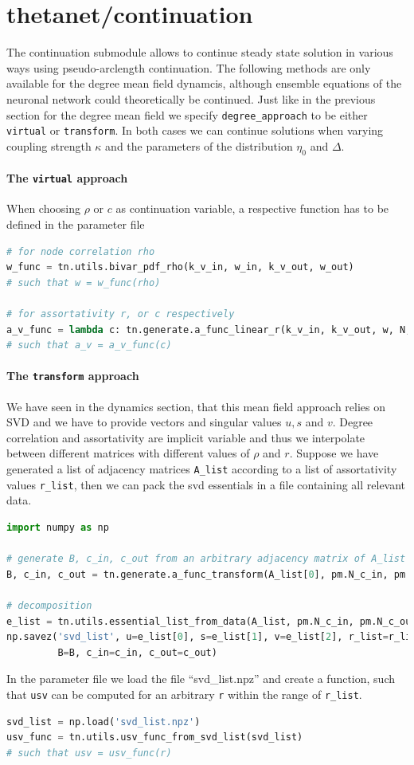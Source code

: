 \documentclass[bibliography=totoc, twoside]{article}
\numberwithin{equation}{section}
\begin{document}
\section{thetanet/continuation}
The continuation submodule allows to continue steady state solution in various ways using pseudo-arclength continuation.
The following methods are only available for the degree mean field dynamcis, although ensemble equations of the neuronal network could theoretically be continued.
Just like in the previous section for the degree mean field we specify \texttt{degree\_approach} to be either \texttt{virtual} or \texttt{transform}.
In both cases we can continue solutions when varying coupling strength $\kappa$ and the parameters of the distribution $\eta_0$ and $\Delta$.
\paragraph*{The \texttt{virtual} approach} When choosing $\rho$ or $c$ as continuation variable, a respective function has to be defined in the parameter file
\begin{lstlisting}[language=python]
# for node correlation rho
w_func = tn.utils.bivar_pdf_rho(k_v_in, w_in, k_v_out, w_out)
# such that w = w_func(rho)

# for assortativity r, or c respectively
a_v_func = lambda c: tn.generate.a_func_linear_r(k_v_in, k_v_out, w, N, c, i_prop, j_prop)
# such that a_v = a_v_func(c)
\end{lstlisting}

\paragraph*{The \texttt{transform} approach} We have seen in the dynamics section, that this mean field approach relies on SVD and we have to provide vectors and singular values $u, s$ and $v$.
Degree correlation and assortativity are implicit variable and thus we interpolate between different matrices with different values of $\rho$ and $r$.
Suppose we have generated a list of adjacency matrices \texttt{A\_list} according to a list of assortativity values \texttt{r\_list}, then we can pack the svd essentials in a file containing all relevant data.
\begin{lstlisting}[language=python]
import numpy as np

# generate B, c_in, c_out from an arbitrary adjacency matrix of A_list
B, c_in, c_out = tn.generate.a_func_transform(A_list[0], pm.N_c_in, pm.N_c_out)[1:]

# decomposition
e_list = tn.utils.essential_list_from_data(A_list, pm.N_c_in, pm.N_c_out)
np.savez('svd_list', u=e_list[0], s=e_list[1], v=e_list[2], r_list=r_list,
         B=B, c_in=c_in, c_out=c_out)
\end{lstlisting}
In the parameter file we load the file ``svd\_list.npz'' and create a function, such that \texttt{usv} can be computed for an arbitrary \texttt{r} within the range of \texttt{r\_list}.
\begin{lstlisting}[language=python]
svd_list = np.load('svd_list.npz')
usv_func = tn.utils.usv_func_from_svd_list(svd_list)
# such that usv = usv_func(r)
\end{lstlisting}
\end{document}
